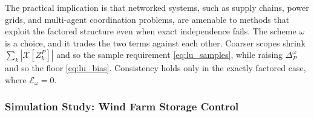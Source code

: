 

The practical implication is that networked systems, such as supply chains, power grids, and multi-agent coordination problems, are amenable to methods that exploit the factored structure even when exact independence fails. The scheme $\omega$ is a choice, and it trades the two terms against each other. Coarser scopes shrink $\sum_k |\mathcal{X}[Z^P_k]|$ and so the sample requirement \eqref{eq:lu_samples}, while raising $\Delta_P^\omega$ and so the floor \eqref{eq:lu_bias}. Consistency holds only in the exactly factored case, where $\mathcal{E}_\omega = 0$.


\subsubsection{Simulation Study: Wind Farm Storage Control}
\label{sec:wind_farm_simulation}


